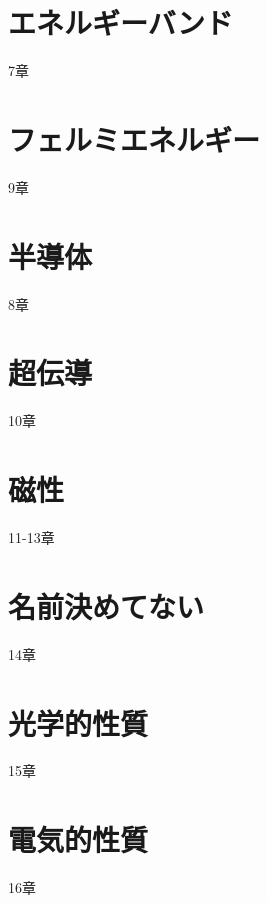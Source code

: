 \documentclass[a4paper]{jsreport}
\begin{document}
    \chapter{エネルギーバンド}
        7章
    \chapter{フェルミエネルギー}
        9章
    \chapter{半導体}
        8章
    \chapter{超伝導}
        10章
    \chapter{磁性}
        11-13章
    \chapter{名前決めてない}
        14章
    \chapter{光学的性質}
        15章
    \chapter{電気的性質}
        16章
    
            
\end{document}
